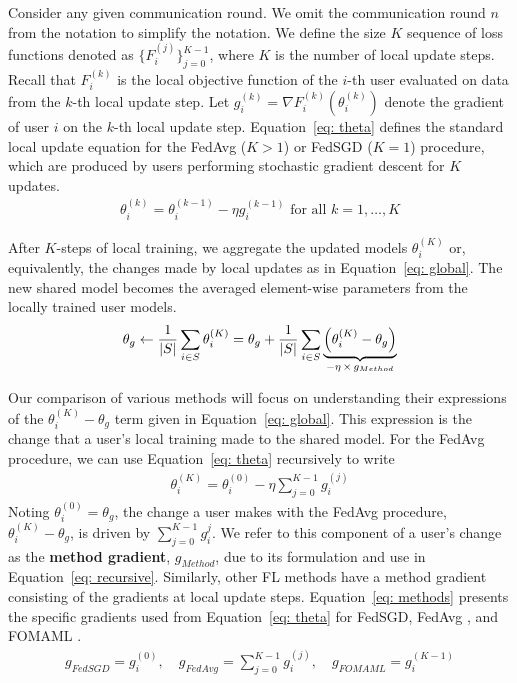 Consider any given communication round. 
We omit the communication round $n$ from the notation to simplify the notation. 
We define the size $K$ sequence of loss functions denoted as $\{ F_i^{(j)} \}_{j = 0}^{K - 1}$, where $K$ is the number of local update steps.
Recall that $F_i^{(k)}$ is the local objective function of the $i$-th user evaluated on data from the $k$-th local update step.
Let $g_i^{(k)} = \nabla F_i^{(k)} \left( \theta_i^{(k)} \right)$ denote the gradient of user $i$ on the $k$-th local update step.
Equation~\ref{eq: theta} defines the standard local update equation for the FedAvg ($K > 1$) or FedSGD ($K = 1$) procedure, which are produced by users performing stochastic gradient descent for $K$ updates.
\begin{align}
    \theta_i^{(k)} = \theta_i^{(k - 1)} - \eta g_i^{(k - 1)} \textrm{ for all } k = 1, \ldots, K
    \label{eq: theta}
\end{align}

After $K$-steps of local training, we aggregate the updated models $\theta_i^{(K)}$ or, equivalently, the changes made by local updates as in Equation~\ref{eq: global}.
The new shared model becomes the averaged element-wise parameters from the locally trained user models.
\begin{align}
        \theta_g \leftarrow \dfrac{1}{\left\lvert S\right\rvert} \sum_{i \in S} \theta_i^{(K)} = \theta_g + \dfrac{1}{\left\lvert S\right\rvert} \sum_{i \in S} \underbrace{\left( \theta_i^{(K)} - \theta_g \right)}_{-\eta\, \times\, g_{Method}}
    \label{eq: global}
\end{align}

Our comparison of various methods will focus on understanding their expressions of the $\theta_i^{(K)} - \theta_g$ term given in Equation~\ref{eq: global}.
This expression is the change that a user's local training made to the shared model.
For the FedAvg procedure, we can use Equation~\ref{eq: theta} recursively to write 
\begin{align}
    \theta_i^{(K)} = \theta_i^{(0)} - \eta \sum_{j = 0}^{K - 1} g_i^{(j)}  \label{eq: recursive}
\end{align}
Noting $\theta_i^{(0)} = \theta_g$, the change a user makes with the FedAvg procedure, $\theta_i^{(K)} - \theta_g$, is driven by $\sum_{j = 0}^{K - 1} g_i^j$.
We refer to this component of a user's change as the \textbf{method gradient}, $g_{Method}$, due to its formulation and use in Equation~\ref{eq: recursive}.
Similarly, other FL methods have a method gradient consisting of the gradients at local update steps.
Equation~\ref{eq: methods} presents the specific gradients used from  Equation~\ref{eq: theta} for FedSGD, FedAvg \citep{fedavg}, and FOMAML \citep{reptile}.
\begin{align}
    g_{FedSGD} = g_i^{(0)}, \quad g_{FedAvg} = \sum_{j = 0}^{K - 1} g_i^{(j)}, \quad g_{FOMAML} = g_i^{(K - 1)} \label{eq: methods}
\end{align}

